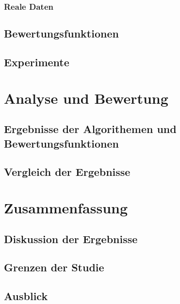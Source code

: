 \subsection{Reale Daten}\label{Reale Daten}

\section{Bewertungsfunktionen}\label{Bewertungsfunktionen}

\section{Experimente}\label{Experimente}

\chapter{Analyse und Bewertung}

\section{Ergebnisse der Algorithemen und Bewertungsfunktionen}\label{Ergebnisse der Algorithemen und Bewertungsfunktionen}

\section{Vergleich der Ergebnisse}\label{Vergleich der Ergebnisse}

\chapter{Zusammenfassung}

\section{Diskussion der Ergebnisse}\label{Diskussion der Ergebnisse}

\section{Grenzen der Studie}\label{Grenzen der Studie}

\section{Ausblick}\label{Ausblick}